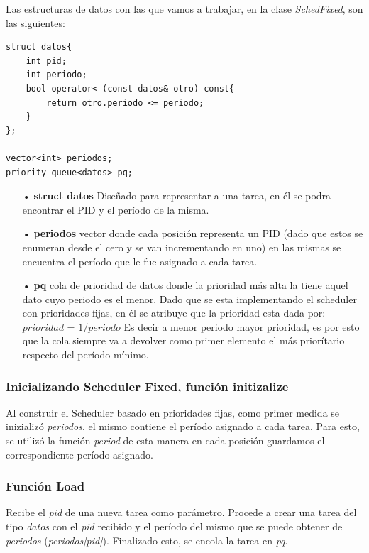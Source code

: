 \documentclass[a4paper]{article}
\begin{document}
Las estructuras de datos con las que vamos a trabajar, en la clase \emph{SchedFixed}, son las siguientes:
	\begin{codesnippet}
	\begin{verbatim}
struct datos{
    int pid;
    int periodo;
    bool operator< (const datos& otro) const{
        return otro.periodo <= periodo;
    }
};
		
vector<int> periodos;
priority_queue<datos> pq;
	\end{verbatim}
	\end{codesnippet}
	\begin{itemize}
	\item[•]\textbf{struct datos} Diseñado para representar a una tarea, en él se podra encontrar el PID y el período de la misma.
	\item[•]\textbf{periodos} vector donde cada posición representa un PID (dado que estos se enumeran desde el cero y se van incrementando en uno) en las mismas se encuentra el período que le fue asignado a cada tarea.
	\item[•]\textbf{pq} cola de prioridad de datos donde la prioridad más alta la tiene aquel dato cuyo periodo es el menor. Dado que se esta implementando el scheduler con prioridades fijas, en él se atribuye que la prioridad esta dada por:\newline
	$prioridad$ = $1 / periodo$ \newline 
	Es decir a menor periodo mayor prioridad, es por esto que la cola siempre va a devolver como primer elemento el más priorítario respecto del per\'iodo m\'inimo.
	\end{itemize}	
	
		
\subsubsection*{Inicializando Scheduler Fixed, función initizalize}		

Al construir el Scheduler basado en prioridades fijas, como primer medida se inizializó \emph{periodos}, el mismo contiene el per\'iodo asignado a cada tarea. Para esto, se utilizó la función \emph{period} de esta manera en cada posición guardamos el correspondiente per\'iodo asignado.

\subsubsection*{Funci\'on Load}

Recibe el \emph{pid} de una nueva tarea como par\'ametro. Procede a crear una tarea del tipo \emph{datos} con el \emph{pid} recibido y el per\'iodo del mismo que se puede obtener de \emph{periodos} (\emph{periodos[pid]}). Finalizado esto, se encola la tarea en \emph{pq}.
\end{document}
